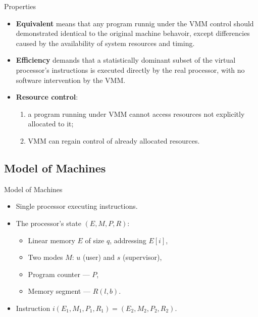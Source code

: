 \begin{frame}{Properties}
\begin{itemize}
\item \textbf{Equivalent} means that any program runnig under the
  VMM control should demonstrated identical to the original machine behavoir,
  except differencies caused by the availability of system resources and
  timing.\pause
\item \textbf{Efficiency} demands that a statistically dominant subset of the
  virtual processor's instructions is executed directly by the real processor,
  with no software intervention by the VMM.\pause
\item \textbf{Resource control}:
  \begin{enumerate}
  \item a program running under VMM cannot access resources not explicitly
    allocated to it;
  \item VMM can regain control of already allocated resources.
  \end{enumerate}
\end{itemize}
\end{frame}

\subsection{Model of Machines}

\begin{frame}{Model of Machines}
\begin{itemize}
\item Single processor executing instructions.
\item The processor's state $(E, M, P, R)$:
  \begin{itemize}
  \item Linear memory $E$ of size $q$, addressing $E[i]$,
  \item Two modes $M$: $u$ (user) and $s$ (supervisor),
  \item Program counter --- $P$,
  \item Memory segment --- $R (l, b)$.
  \end{itemize}
\item Instruction $i(E_1, M_1, P_1, R_1) = (E_2, M_2, P_2, R_2)$.
\end{itemize}
\end{frame}

